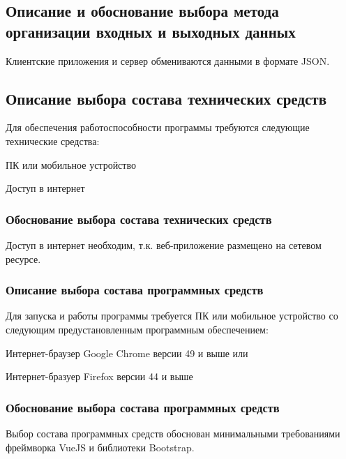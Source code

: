 \subsection{Описание и обоснование выбора метода организации входных и выходных
данных}
Клиентские приложения и сервер обмениваются данными в формате JSON.

\subsection{Описание выбора состава технических средств}
Для обеспечения работоспособности программы требуются следующие
технические средства:

\begin{my_enumerate}
  \item ПК или мобильное устройство
  \item Доступ в интернет
\end{my_enumerate}

\subsubsection{Обоснование выбора состава технических средств}
Доступ в интернет необходим, т.к. веб-приложение размещено на сетевом ресурсе.

\subsubsection{Описание выбора состава программных средств}
Для запуска и работы программы требуется ПК или мобильное устройство со
следующим предустановленным программным обеспечением:

\begin{my_enumerate}
  \item Интернет-браузер Google Chrome версии 49 и выше или
  \item Интернет-бразуер Firefox версии 44 и выше
\end{my_enumerate}

\subsubsection{Обоснование выбора состава программных средств}
Выбор состава программных средств обоснован минимальными требованиями
фреймворка VueJS и библиотеки Bootstrap. \cite{caniuse}

